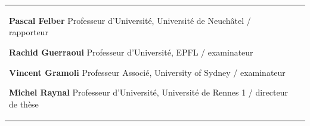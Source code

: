 \begin{titlepage}
\begin{center}
\begin{minipage}{\glarg}
\begin{tabular}{p{7cm}p{10cm}}
\begin{minipage}{\plarg}
{\Large\bf Pascal Felber \vspace{0mm}\newline}
{ Professeur d'Universit{\'e},  Universit{\'e} de Neuch\^{a}tel \!/\! rapporteur\vspace{-2mm}\newline}

{\Large\bf Rachid Guerraoui\vspace{0mm}\newline}
{ Professeur d'Universit{\'e}, EPFL \!/\! examinateur \vspace{-2mm}\newline}

{\Large\bf Vincent Gramoli \vspace{0mm}\newline}
{ Professeur Associ{\'e}, University of Sydney \!/\! examinateur\vspace{-2mm}\newline}

{\Large\bf Michel Raynal \vspace{0mm}\newline}
{ Professeur d'Universit{\'e}, Universit{\'e} de Rennes 1 \!/\! directeur de th\`ese\vspace{-2mm}\newline}



\end{minipage}
\end{tabular}

\end{minipage}
\end{center}
\end{titlepage}

